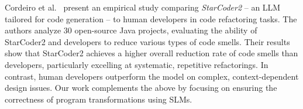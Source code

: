 Cordeiro et al.~\cite{cordeiro2024empiricalstudycoderefactoring} present an empirical study comparing \emph{StarCoder2} -- an LLM tailored for code generation -- to human developers in code refactoring tasks. The authors analyze 30 open-source Java projects, evaluating the ability of StarCoder2 and developers to reduce various types of code smells. Their results show that StarCoder2 achieves a higher overall reduction rate of code smells than developers, particularly excelling at systematic, repetitive refactorings. In contrast, human developers outperform the model on complex, context-dependent design issues.
Our work complements the above by focusing on ensuring the correctness of program transformations using SLMs.